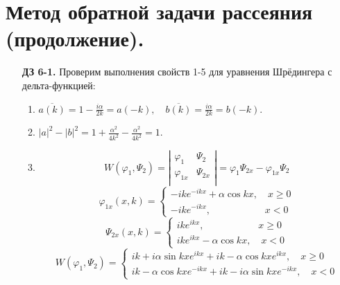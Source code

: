 \documentclass[12pt]{article}
\theoremstyle{definition}
\begin{document}
\section{Метод обратной задачи рассеяния (продолжение).}
\begin{itemize}
    \item[\textbf{ДЗ 6-1.}]
    Проверим выполнения свойств 1-5 для уравнения Шрёдингера с дельта-функцией:
    \begin{enumerate}
        \item $\overline{a(k)}=1-\frac{i\alpha}{2k}=a(-k),\quad \overline{b(k)}=\frac{i\alpha}{2k}=b(-k)$.
        \item $|a|^2-|b|^2=1+\frac{\alpha^2}{4k^2}-\frac{\alpha^2}{4k^2}=1$.
        \item 
        \begin{equation}
            W(\varphi_1,\Psi_2)=\left|
            \begin{array}{cc}
            \varphi_1 & \Psi_2\\
            \varphi_{1x} & \Psi_{2x} \\
        \end{array}
        \right|=\varphi_1\Psi_{2x}-\varphi_{1x}\Psi_2
        \end{equation}
        \begin{equation}
            \varphi_{1x}(x,k)=\left\{
        \begin{array}{l}
        -ike^{-ikx}+\alpha\cos kx,\quad x\geq 0\\
        -ike^{-ikx},\quad\quad\quad\quad\quad\;\; x<0
        \end{array}
        \right.
        \end{equation}
        \begin{equation}
            \Psi_{2x}(x,k)=\left\{
        \begin{array}{l}
        ike^{ikx},\quad\quad\quad\quad\quad\;\; x\geq 0\\
        ike^{ikx}-\alpha\cos kx,\quad x<0
        \end{array}
        \right.
        \end{equation}
        \begin{equation}
            W(\varphi_1,\Psi_2)=\left\{
        \begin{array}{l}
        ik+i\alpha\sin kxe^{ikx}+ik-\alpha\cos kxe^{ikx},\quad x\geq 0\\
        ik-\alpha\cos kxe^{-ikx}+ik-i\alpha\sin kxe^{-ikx},\quad x<0
        \end{array}

\end{equation}
\end{enumerate}
\end{itemize}
\end{document}
